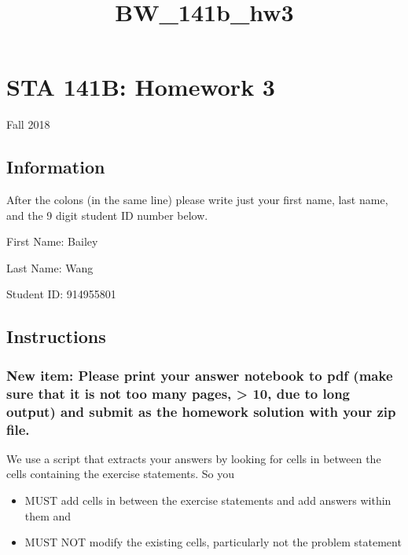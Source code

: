 \documentclass[11pt]{article}
\title{BW\_141b\_hw3}
\providecommand{\tightlist}{%
      \setlength{\itemsep}{0pt}\setlength{\parskip}{0pt}}
\begin{document}
    
    
    \maketitle
    
    

    
    \section{STA 141B: Homework 3}\label{sta-141b-homework-3}

Fall 2018

    \subsection{Information}\label{information}

After the colons (in the same line) please write just your first name,
last name, and the 9 digit student ID number below.

First Name: Bailey

Last Name: Wang

Student ID: 914955801

    \subsection{Instructions}\label{instructions}

\subsubsection{New item: Please print your answer notebook to pdf (make
sure that it is not too many pages, \textgreater{} 10, due to long
output) and submit as the homework solution with your zip
file.}\label{new-item-please-print-your-answer-notebook-to-pdf-make-sure-that-it-is-not-too-many-pages-10-due-to-long-output-and-submit-as-the-homework-solution-with-your-zip-file.}

We use a script that extracts your answers by looking for cells in
between the cells containing the exercise statements. So you

\begin{itemize}
\tightlist
\item
  MUST add cells in between the exercise statements and add answers
  within them and
\item
  MUST NOT modify the existing cells, particularly not the problem
  statement
\end{itemize}
\end{document}
